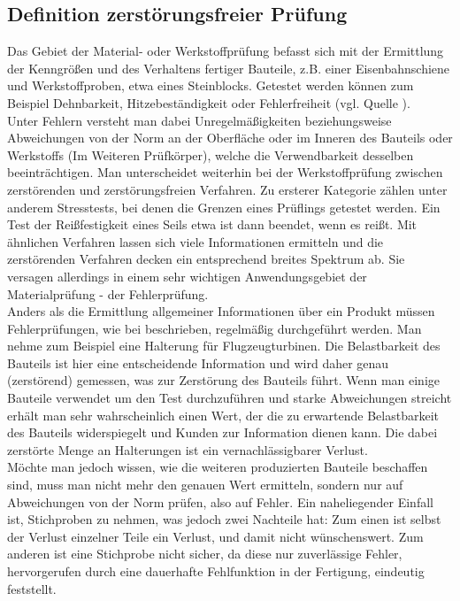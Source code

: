 \documentclass[reducespace,stylepage,semiarbeit]{spezidoc}
\begin{document}
\subsection{Definition zerstörungsfreier Prüfung}
Das Gebiet der Material- oder Werkstoffprüfung befasst sich mit der Ermittlung der Kenngrößen und des Verhaltens fertiger Bauteile, z.B. 
einer Eisenbahnschiene und Werkstoffproben, etwa eines Steinblocks. 
Getestet werden können zum Beispiel Dehnbarkeit, Hitzebeständigkeit oder Fehlerfreiheit (vgl. Quelle \cite{theorie}).\\ 
Unter Fehlern versteht man dabei Unregelmäßigkeiten beziehungsweise Abweichungen von der Norm an der Oberfläche oder im Inneren des Bauteils oder Werkstoffs (Im Weiteren Prüfkörper), welche die Verwendbarkeit desselben beeinträchtigen. 
Man unterscheidet weiterhin bei der Werkstoffprüfung zwischen zerstörenden und zerstörungsfreien Verfahren. 
Zu ersterer Kategorie zählen unter anderem Stresstests, bei denen die Grenzen eines Prüflings getestet werden. 
Ein Test der Reißfestigkeit eines Seils etwa ist dann beendet, wenn es reißt. 
Mit ähnlichen Verfahren lassen sich viele Informationen ermitteln und die zerstörenden Verfahren decken ein entsprechend breites Spektrum ab. 
Sie versagen allerdings in einem sehr wichtigen Anwendungsgebiet der Materialprüfung - der Fehlerprüfung.\\
Anders als die Ermittlung allgemeiner Informationen über ein Produkt müssen Fehlerprüfungen, wie bei \cite{zfp-abgrenzung} beschrieben, regelmäßig durchgeführt werden. 
Man nehme zum Beispiel eine Halterung für Flugzeugturbinen. 
Die Belastbarkeit des Bauteils ist hier eine entscheidende Information und wird daher genau (zerstörend) gemessen, was zur Zerstörung des Bauteils führt. 
Wenn man einige Bauteile verwendet um den Test durchzuführen und starke Abweichungen streicht erhält man sehr wahrscheinlich einen Wert, der die zu erwartende Belastbarkeit des Bauteils widerspiegelt und Kunden zur Information dienen kann. 
Die dabei zerstörte Menge an Halterungen ist ein vernachlässigbarer Verlust.\\
Möchte man jedoch wissen, wie die weiteren produzierten Bauteile beschaffen sind, muss man nicht mehr den genauen Wert ermitteln, sondern nur auf Abweichungen von der Norm prüfen, also auf Fehler. 
Ein naheliegender Einfall ist, Stichproben zu nehmen, was jedoch zwei Nachteile hat: Zum einen ist selbst der Verlust einzelner Teile ein Verlust, und damit nicht wünschenswert. 
Zum anderen ist eine Stichprobe nicht sicher, da diese nur zuverlässige Fehler, hervorgerufen durch eine dauerhafte Fehlfunktion in der Fertigung, eindeutig feststellt.\\
\end{document}
